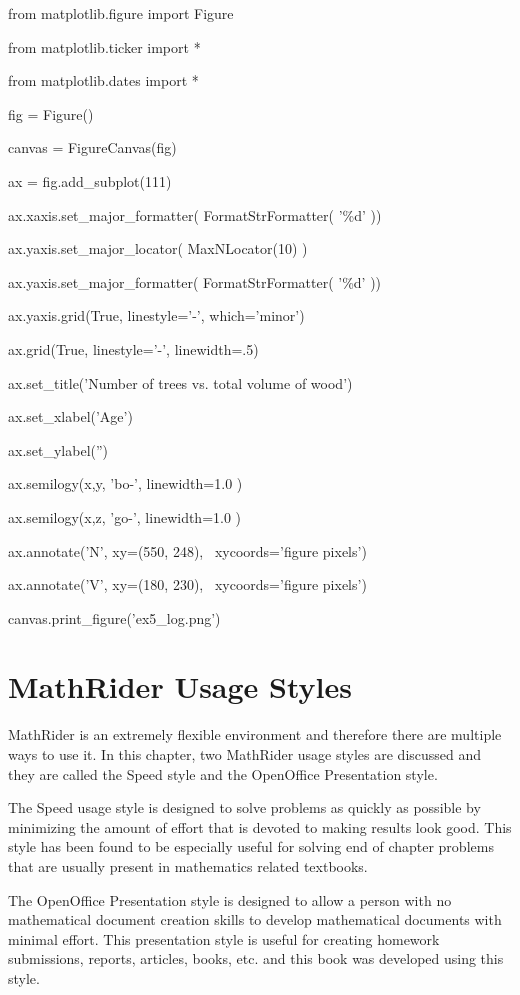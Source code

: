 \documentclass[12pt,oneside]{book}
\begin{document}
from matplotlib.figure import Figure

from matplotlib.ticker import *

from matplotlib.dates import *

fig = Figure()

canvas = FigureCanvas(fig)

ax = fig.add\_subplot(111)

ax.xaxis.set\_major\_formatter( FormatStrFormatter(
'\%d' ))

ax.yaxis.set\_major\_locator( MaxNLocator(10) )

ax.yaxis.set\_major\_formatter( FormatStrFormatter(
'\%d' ))

ax.yaxis.grid(True, linestyle='{}-',
which='minor')

ax.grid(True, linestyle='{}-',
linewidth=.5)

ax.set\_title('Number of trees vs. total volume of
wood')

ax.set\_xlabel('Age')

ax.set\_ylabel('')

ax.semilogy(x,y, 'bo{}-',
linewidth=1.0 )

ax.semilogy(x,z, 'go{}-',
linewidth=1.0 )

ax.annotate('N', xy=(550, 248),
\ xycoords='figure pixels')

ax.annotate('V', xy=(180, 230),
\ xycoords='figure pixels')

canvas.print\_figure('ex5\_log.png')

{\textbar}


\chapter[MathRider Usage Styles]{MathRider Usage Styles}

MathRider is an extremely flexible environment and therefore there are multiple ways to use it. In this chapter, two MathRider usage styles are discussed and they are called the Speed style and the OpenOffice Presentation style. 

The Speed usage style is designed to solve problems as quickly as possible by minimizing the amount of effort that is devoted to making results look good. This style has been found to be especially useful for solving end of chapter problems that are usually present in mathematics related textbooks. 

The OpenOffice Presentation style is designed to allow a person with no mathematical document creation skills to develop mathematical documents with minimal effort. This presentation style is useful for creating homework submissions, reports, articles, books, etc. and this book was developed using this style.
\end{document}
